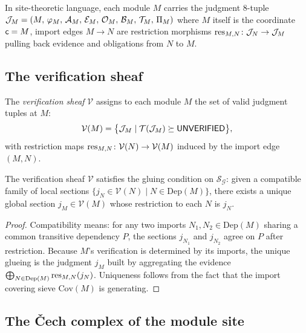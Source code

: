 \documentclass[11pt]{article}
\newcommand{\IG}{\mathcal{G}}              %
\newcommand{\Dep}{\mathrm{Dep}}            %
\newcommand{\ModSite}{\mathcal{S}_{\IG}}   %
\newcommand{\tgeq}{\succeq}              %
\begin{document}
\begin{remark}
In site-theoretic language, each module $M$ carries the judgment
8-tuple
$\mathcal{J}_M = (M,\,\varphi_M,\,\mathcal{A}_M,\,\mathcal{E}_M,\,\mathcal{O}_M,\,\mathcal{B}_M,\,\mathcal{T}_M,\,\Pi_M)$
where $M$ itself is the coordinate $\mathsf{c} = M$, import edges
$M \to N$ are restriction morphisms
$\mathrm{res}_{M,N} \colon \mathcal{J}_N \to \mathcal{J}_M$ pulling back evidence and
obligations from $N$ to $M$.
\end{remark}

\subsection{The verification sheaf}

\begin{definition}
\label{def:verif-sheaf}
The \emph{verification sheaf} $\mathcal{V}$ assigns to each module $M$
the set of valid judgment tuples at $M$:
\[
  \mathcal{V}(M) = \bigl\{\J_M \mid \trust(\J_M) \tgeq \Tunver\bigr\},
\]
with restriction maps
$\mathrm{res}_{M,N} \colon \mathcal{V}(N) \to \mathcal{V}(M)$
induced by the import edge $(M, N)$.
\end{definition}

\begin{proposition}
\label{prop:descent}
The verification sheaf $\mathcal{V}$ satisfies the gluing condition
on $\ModSite$: given a compatible family of local sections
$\{j_N \in \mathcal{V}(N) \mid N \in \Dep(M)\}$, there exists a
unique global section $j_M \in \mathcal{V}(M)$ whose restriction to
each $N$ is $j_N$.
\end{proposition}

\begin{proof}
Compatibility means: for any two imports $N_1, N_2 \in \Dep(M)$ sharing
a common transitive dependency $P$, the sections $j_{N_1}$ and $j_{N_2}$
agree on $P$ after restriction.  Because $M$'s verification is
determined by its imports, the unique glueing is the judgment
$j_M$ built by aggregating the evidence
$\bigoplus_{N \in \Dep(M)} \res_{M,N}(j_N)$.
Uniqueness follows from the fact that the import covering sieve
$\mathrm{Cov}(M)$ is generating.
\end{proof}

\subsection{The \v{C}ech complex of the module site}
\end{document}
